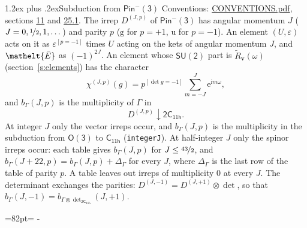 \documentclass[10pt,a4paper]{article}
\makeatletter
\renewcommand\section{\@startsection{section}{1}{\z@}{-3ex plus -1ex minus -.2ex}%
  {1.2ex plus .2ex}{\normalfont\large\sffamily\bfseries\color{parttitle}}}
\newcommand{\needspace}[1]{\par\penalty-100\begingroup\dimen0=#1\relax\dimen2=\pagegoal
  \advance\dimen2-\pagetotal\ifdim\dimen0>\dimen2\relax\ifdim\dimen2>0pt\vfil\break\fi\fi
  \endgroup}
\numberwithin{equation}{section}
\newcommand{\eltfont}[1]{{\let\sigma\eltsigma\mathelt{#1}}}
\newcommand{\grp}[1]{\mathsf{#1}}
\newcommand{\elt}[1]{\eltfont{#1}}
\newcommand{\ptag}[1]{\mathrm{#1}}
\newcommand{\iverson}[1]{[#1]}
\newcommand{\restr}[2]{#1\!\downarrow#2}
\newcommand{\vv}{\mathbf{v}}
\newcommand{\iunit}{\mathrm{i}}
\newcommand{\expe}{\mathrm{e}}
\newcommand{\irrJp}[2]{D^{(#1,#2)}}
\newcommand{\irrprod}{\otimes}
\newcommand{\barred}[1]{\bar{#1}}
\newcommand{\lift}[1]{\tilde{#1}}
\makeatother
\begin{document}
\section{Subduction from \texorpdfstring{$\grp{Pin^{-}(3)}$}{Pin(3)}}\label{s:subduction_parent}
Conventions: \href{../../CONVENTIONS.pdf}{CONVENTIONS.pdf}, sections \href{../../../rotation/CONVENTIONS.pdf\#conv.11}{11} and \href{../../CONVENTIONS.pdf\#conv.25.1}{25.1}.
\leavevmode\label{n:index.J}\label{n:index.parity}\label{n:irrep.o3}The irrep $\irrJp{J}{p}$ of \href{Pinminus3.pdf}{$\grp{Pin^{-}(3)}$} has angular momentum $J$ ($J = 0, \nicefrac{1}{2}, 1, \dots$) and parity $p$ ($\ptag{g}$ for $p = +1$, $\ptag{u}$ for $p = -1$). An element $(U, \varepsilon)$ acts on it as $\varepsilon^{[p = -1]}$ times $U$ acting on the kets of angular momentum $J$, and $\elt{\barred{E}}$ as $(-1)^{2J}$. \label{n:function.character.parent}\label{n:function.multiplicity}An element whose $\grp{SU(2)}$ part is $\lift{R}_{\vv}(\omega)$ (section~\ref{s:elements}) has the character
\begin{equation}\label{e:chi}\chi^{(J,p)}(g) = p^{\iverson{\det g = -1}}\sum_{m=-J}^{J} \expe^{\iunit m\omega},\end{equation}
and $b_\Gamma(J, p)$ is the multiplicity of $\Gamma$ in
\begin{equation}\label{e:parent}\restr{\irrJp{J}{p}}{\grp{2C_{11h}}}.\end{equation}
At integer $J$ only the vector irreps occur, and $b_\Gamma(J, p)$ is the multiplicity in the subduction from $\grp{O(3)}$ to \href{../../../rotation/data/pdf/C11h.pdf}{$\grp{C_{11h}}$} (\texttt{integerJ}). \label{n:index.increment}At half-integer $J$ only the spinor irreps occur: each table gives $b_\Gamma(J, p)$ for $J \le \nicefrac{43}{2}$, and $b_\Gamma(J + 22, p) = b_\Gamma(J, p) + \Delta_\Gamma$ for every $J$, where $\Delta_\Gamma$ is the last row of the table of parity $p$. A table leaves out irreps of multiplicity 0 at every $J$.
\leavevmode\label{n:operator.determinant.character}The determinant exchanges the parities: $\irrJp{J}{-1} = \irrJp{J}{+1} \irrprod \det$, so that $b_\Gamma(J, -1) = b_{\Gamma \irrprod \det_{\grp{2C_{11h}}}}(J, +1)$.
\needspace{82pt}
\end{document}

